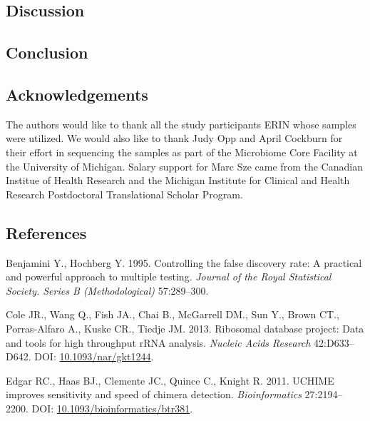 \documentclass[12pt,]{article}
\begin{document}
\newpage

\subsection{Discussion}\label{discussion}

\newpage

\subsection{Conclusion}\label{conclusion}

\newpage

\subsection{Acknowledgements}\label{acknowledgements}

The authors would like to thank all the study participants ERIN whose
samples were utilized. We would also like to thank Judy Opp and April
Cockburn for their effort in sequencing the samples as part of the
Microbiome Core Facility at the University of Michigan. Salary support
for Marc Sze came from the Canadian Institue of Health Research and the
Michigan Institute for Clinical and Health Research Postdoctoral
Translational Scholar Program.

\newpage

\subsection{References}\label{references}

\hypertarget{refs}{}
\hypertarget{ref-benjamini_controlling_1995}{}
Benjamini Y., Hochberg Y. 1995. Controlling the false discovery rate: A
practical and powerful approach to multiple testing. \emph{Journal of
the Royal Statistical Society. Series B (Methodological)} 57:289--300.

\hypertarget{ref-rdp_Cole_2013}{}
Cole JR., Wang Q., Fish JA., Chai B., McGarrell DM., Sun Y., Brown CT.,
Porras-Alfaro A., Kuske CR., Tiedje JM. 2013. Ribosomal database
project: Data and tools for high throughput rRNA analysis. \emph{Nucleic
Acids Research} 42:D633--D642. DOI:
\href{https://doi.org/10.1093/nar/gkt1244}{10.1093/nar/gkt1244}.

\hypertarget{ref-uchime_Edgar_2011}{}
Edgar RC., Haas BJ., Clemente JC., Quince C., Knight R. 2011. UCHIME
improves sensitivity and speed of chimera detection.
\emph{Bioinformatics} 27:2194--2200. DOI:
\href{https://doi.org/10.1093/bioinformatics/btr381}{10.1093/bioinformatics/btr381}.
\end{document}
